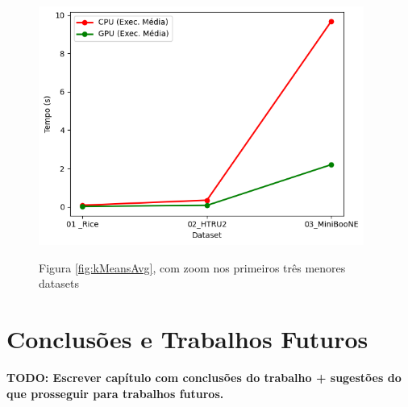 \documentclass[12pt,
openright, 
oneside, %
a4paper,    %
brazil]{facom-ufu-abntex2}
\begin{document}
\begin{figure}[h]
  \caption{Figura \ref{fig:kMeansAvg}, com zoom nos primeiros três menores datasets}
  \centering
  \includegraphics[width=0.95\textwidth]{kMeansResultsAvgZoomed.png}
  \label{fig:kMeansAvgZoomed}
\end{figure}






\chapter{Conclusões e Trabalhos Futuros}


\textbf{TODO: Escrever capítulo com conclusões do trabalho + sugestões do que prosseguir para trabalhos futuros.}











\postextual


\end{document}
